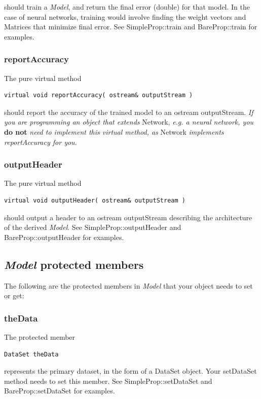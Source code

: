 \documentclass{report}
\begin{document}
should train a {\em Model}, and return the final error (double) for
that model.  In the case of neural networks, training would involve
finding the weight vectors and Matrices that minimize final error. See
SimpleProp::train and BareProp::train for examples.

\subsubsection{reportAccuracy}
The pure virtual method

\begin{verbatim}
virtual void reportAccuracy( ostream& outputStream )
\end{verbatim}

should report the accuracy of the trained model to an ostream
outputStream.  {\em If you are programming an object that extends}
Network, {\em e.g. a neural network, you} {\bf do not} {\em need to
implement this virtual method, as} Network {\em implements
reportAccuracy for you.}

\subsubsection{outputHeader}
The pure virtual method

\begin{verbatim}
virtual void outputHeader( ostream& outputStream )
\end{verbatim}

should output a header to an ostream outputStream describing the
architecture of the derived {\em Model}.  See SimpleProp::outputHeader
and BareProp::outputHeader for examples.

\subsection{{\em Model} protected members}

The following are the protected members in {\em Model} that your
object needs to set or get:

\subsubsection{theData}

The protected member

\begin{verbatim}
DataSet theData
\end{verbatim}

represents the primary dataset, in the form of a DataSet object.  Your
setDataSet method needs to set this member.  See
SimpleProp::setDataSet and BareProp::setDataSet for examples.
\end{document}
